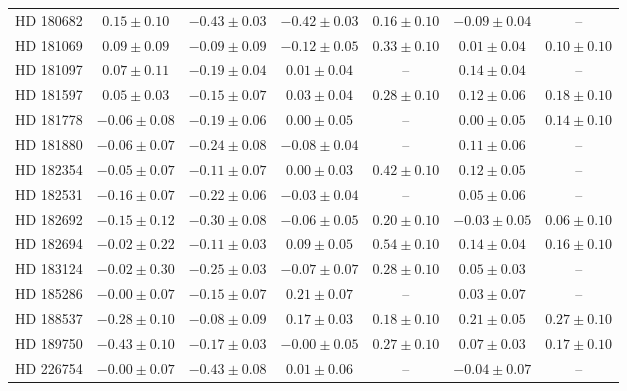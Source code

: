 \begin{table*}
\begin{tabular}{ccccccc}
HD 180682 & $0.15 \pm 0.10$ & $-0.43 \pm 0.03$ & $-0.42 \pm 0.03$ & $0.16 \pm 0.10$ & $-0.09 \pm 0.04$ & -- \\
HD 181069 & $0.09 \pm 0.09$ & $-0.09 \pm 0.09$ & $-0.12 \pm 0.05$ & $0.33 \pm 0.10$ & $0.01 \pm 0.04$ & $0.10 \pm 0.10$ \\
HD 181097 & $0.07 \pm 0.11$ & $-0.19 \pm 0.04$ & $0.01 \pm 0.04$ & -- & $0.14 \pm 0.04$ & -- \\
HD 181597 & $0.05 \pm 0.03$ & $-0.15 \pm 0.07$ & $0.03 \pm 0.04$ & $0.28 \pm 0.10$ & $0.12 \pm 0.06$ & $0.18 \pm 0.10$ \\
HD 181778 & $-0.06 \pm 0.08$ & $-0.19 \pm 0.06$ & $0.00 \pm 0.05$ & -- & $0.00 \pm 0.05$ & $0.14 \pm 0.10$ \\
HD 181880 & $-0.06 \pm 0.07$ & $-0.24 \pm 0.08$ & $-0.08 \pm 0.04$ & -- & $0.11 \pm 0.06$ & -- \\
HD 182354 & $-0.05 \pm 0.07$ & $-0.11 \pm 0.07$ & $0.00 \pm 0.03$ & $0.42 \pm 0.10$ & $0.12 \pm 0.05$ & -- \\
HD 182531 & $-0.16 \pm 0.07$ & $-0.22 \pm 0.06$ & $-0.03 \pm 0.04$ & -- & $0.05 \pm 0.06$ & -- \\
HD 182692 & $-0.15 \pm 0.12$ & $-0.30 \pm 0.08$ & $-0.06 \pm 0.05$ & $0.20 \pm 0.10$ & $-0.03 \pm 0.05$ & $0.06 \pm 0.10$ \\
HD 182694 & $-0.02 \pm 0.22$ & $-0.11 \pm 0.03$ & $0.09 \pm 0.05$ & $0.54 \pm 0.10$ & $0.14 \pm 0.04$ & $0.16 \pm 0.10$ \\
HD 183124 & $-0.02 \pm 0.30$ & $-0.25 \pm 0.03$ & $-0.07 \pm 0.07$ & $0.28 \pm 0.10$ & $0.05 \pm 0.03$ & -- \\
HD 185286 & $-0.00 \pm 0.07$ & $-0.15 \pm 0.07$ & $0.21 \pm 0.07$ & -- & $0.03 \pm 0.07$ & -- \\
HD 188537 & $-0.28 \pm 0.10$ & $-0.08 \pm 0.09$ & $0.17 \pm 0.03$ & $0.18 \pm 0.10$ & $0.21 \pm 0.05$ & $0.27 \pm 0.10$ \\
HD 189750 & $-0.43 \pm 0.10$ & $-0.17 \pm 0.03$ & $-0.00 \pm 0.05$ & $0.27 \pm 0.10$ & $0.07 \pm 0.03$ & $0.17 \pm 0.10$ \\
HD 226754 & $-0.00 \pm 0.07$ & $-0.43 \pm 0.08$ & $0.01 \pm 0.06$ & -- & $-0.04 \pm 0.07$ & -- \\
\hline
\end{tabular}
\end{table*}
